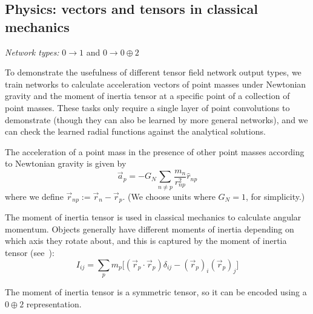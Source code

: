 \documentclass{article}
\begin{document}
\subsection{Physics: vectors and tensors in classical mechanics}

{\em Network types:} $0 \rightarrow 1$ and $0 \rightarrow 0 \oplus 2$

To demonstrate the usefulness of different tensor field network output types, we train networks to calculate acceleration vectors of point masses under Newtonian gravity and the moment of inertia tensor at a specific point of a collection of point masses. These tasks only require a single layer of point convolutions to demonstrate (though they can also be learned by more general networks), and we can check the learned radial functions against the analytical solutions.

The acceleration of a point mass in the presence of other point masses according to Newtonian gravity is given by
\[\vec{a}_p = -G_N\sum_{n\neq p} \frac{m_n}{r_{np}^2} \hat{r}_{np}\] 
where we define $\vec{r}_{np} := \vec{r}_n - \vec{r}_p$.  (We choose units where $G_N = 1$, for simplicity.)

The moment of inertia tensor is used in classical mechanics to calculate angular momentum.  Objects generally have different moments of inertia depending on which axis they rotate about, and this is captured by the moment of inertia tensor (see~\citet{landau1976mechanics}):
\[I_{ij} = \sum_p m_p \Big[ (\vec{r}_p \cdot \vec{r}_p)\delta_{ij} - (\vec{r}_p)_i (\vec{r}_p)_j \Big]\]

The moment of inertia tensor is a symmetric tensor, so it can be encoded using a $0 \oplus 2$ representation. %
\end{document}
